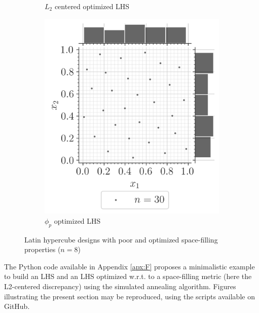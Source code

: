 \begin{figure}[ht]
\begin{subfigure}[b]{0.32\textwidth}
        \caption{$L_2$ centered optimized LHS}
    \end{subfigure}
    \hfill
    \begin{subfigure}[b]{0.32\textwidth}
        \centering
        \includegraphics[width=\textwidth]{../numerical_experiments/chapter1/figures/optimized_phip_LHS.png}
        \caption{$\phi_p$ optimized LHS}
    \end{subfigure}
       \caption{Latin hypercube designs with poor and optimized space-filling properties ($n=8$)}
       \label{fig:LHS_designs}
\end{figure}


\begin{otexample}
    The Python code available in Appendix \ref{apx:F} proposes a minimalistic \ot example to build an LHS and 
    an LHS optimized w.r.t. to a space-filling metric (here the L2-centered discrepancy) using the simulated annealing algorithm. 
    Figures illustrating the present section may be reproduced, using the \ot scripts available on GitHub\footnotemark.  
\end{otexample}

